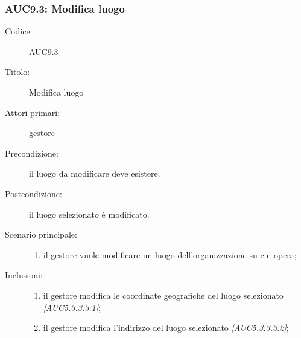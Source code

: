 \documentclass[../../../analisi-dei-requisiti.tex]{subfiles}
\begin{document}
\subsubsection{AUC9.3: Modifica luogo}%
\label{subs:AUC9.3}
\begin{description}
  \item[Codice:] AUC9.3
  \item[Titolo:] Modifica luogo
  \item[Attori primari:] gestore
  \item[Precondizione:] il luogo da modificare deve esistere.
  \item[Postcondizione:] il luogo selezionato è modificato.
  \item[Scenario principale:]
  \begin{enumerate}
    \item il gestore vuole modificare un luogo dell'organizzazione su cui opera;
  \end{enumerate}
  \item[Inclusioni:]
  \begin{enumerate}
    \item il gestore modifica le coordinate geografiche del luogo selezionato \emph{[AUC5.3.3.3.1]};
    \item il gestore modifica l'indirizzo del luogo selezionato \emph{[AUC5.3.3.3.2]};
  \end{enumerate}
\end{description}
\end{document}
